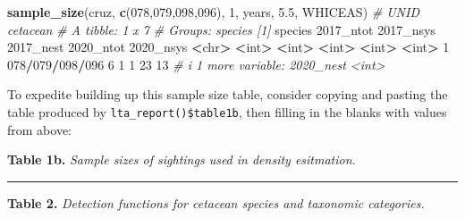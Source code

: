 \documentclass[
]{book}
\newenvironment{Shaded}{\begin{snugshade}}{\end{snugshade}}
\newcommand{\AttributeTok}[1]{\textcolor[rgb]{0.13,0.29,0.53}{#1}}
\newcommand{\CommentTok}[1]{\textcolor[rgb]{0.56,0.35,0.01}{\textit{#1}}}
\newcommand{\DecValTok}[1]{\textcolor[rgb]{0.00,0.00,0.81}{#1}}
\newcommand{\ErrorTok}[1]{\textcolor[rgb]{0.64,0.00,0.00}{\textbf{#1}}}
\newcommand{\FloatTok}[1]{\textcolor[rgb]{0.00,0.00,0.81}{#1}}
\newcommand{\FunctionTok}[1]{\textcolor[rgb]{0.13,0.29,0.53}{\textbf{#1}}}
\newcommand{\NormalTok}[1]{#1}
\newcommand{\SpecialCharTok}[1]{\textcolor[rgb]{0.81,0.36,0.00}{\textbf{#1}}}
\newcommand{\StringTok}[1]{\textcolor[rgb]{0.31,0.60,0.02}{#1}}
\begin{document}
\begin{Shaded}
\begin{Highlighting}[]
\FunctionTok{sample\_size}\NormalTok{(cruz, }\FunctionTok{c}\NormalTok{(}\StringTok{\textquotesingle{}078\textquotesingle{}}\NormalTok{,}\StringTok{\textquotesingle{}079\textquotesingle{}}\NormalTok{,}\StringTok{\textquotesingle{}098\textquotesingle{}}\NormalTok{,}\StringTok{\textquotesingle{}096\textquotesingle{}}\NormalTok{), }
            \DecValTok{1}\NormalTok{, years, }\FloatTok{5.5}\NormalTok{, }\StringTok{\textquotesingle{}WHICEAS\textquotesingle{}}\NormalTok{) }\CommentTok{\# UNID cetacean}
\CommentTok{\# A tibble: 1 x 7}
\CommentTok{\# Groups:   species [1]}
\NormalTok{  species         }\StringTok{\textasciigrave{}}\AttributeTok{2017\_ntot}\StringTok{\textasciigrave{}} \StringTok{\textasciigrave{}}\AttributeTok{2017\_nsys}\StringTok{\textasciigrave{}} \StringTok{\textasciigrave{}}\AttributeTok{2017\_nest}\StringTok{\textasciigrave{}} \StringTok{\textasciigrave{}}\AttributeTok{2020\_ntot}\StringTok{\textasciigrave{}} \StringTok{\textasciigrave{}}\AttributeTok{2020\_nsys}\StringTok{\textasciigrave{}}
  \SpecialCharTok{\textless{}}\NormalTok{chr}\SpecialCharTok{\textgreater{}}                 \ErrorTok{\textless{}}\NormalTok{int}\SpecialCharTok{\textgreater{}}       \ErrorTok{\textless{}}\NormalTok{int}\SpecialCharTok{\textgreater{}}       \ErrorTok{\textless{}}\NormalTok{int}\SpecialCharTok{\textgreater{}}       \ErrorTok{\textless{}}\NormalTok{int}\SpecialCharTok{\textgreater{}}       \ErrorTok{\textless{}}\NormalTok{int}\SpecialCharTok{\textgreater{}}
\DecValTok{1} \DecValTok{078}\SpecialCharTok{/}\DecValTok{079}\SpecialCharTok{/}\DecValTok{098}\SpecialCharTok{/}\DecValTok{096}           \DecValTok{6}           \DecValTok{1}           \DecValTok{1}          \DecValTok{23}          \DecValTok{13}
\CommentTok{\# i 1 more variable: \textasciigrave{}2020\_nest\textasciigrave{} \textless{}int\textgreater{}}
\end{Highlighting}
\end{Shaded}

To expedite building up this sample size table, consider copying and pasting the table produced by \texttt{lta\_report()\$table1b}, then filling in the blanks with values from above:

\textbf{Table 1b.} \emph{Sample sizes of sightings used in density esitmation.}

\begin{center}\rule{0.5\linewidth}{0.5pt}\end{center}

\textbf{Table 2.} \emph{Detection functions for cetacean species and taxonomic categories.}
\end{document}

